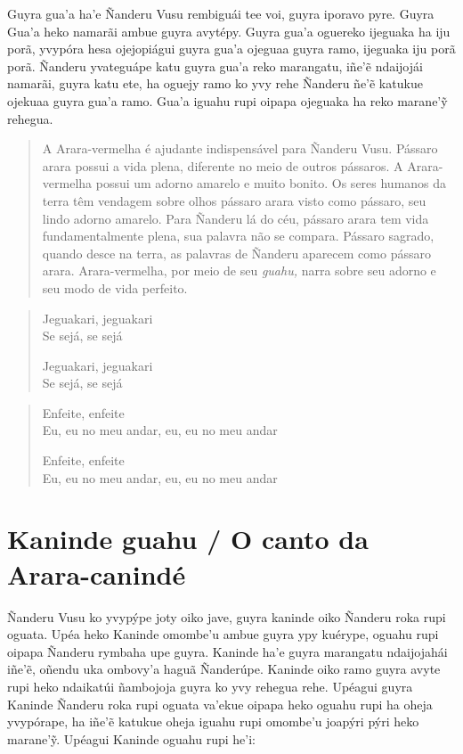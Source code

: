 Guyra gua'a ha'e Ñanderu Vusu rembiguái tee voi, guyra iporavo pyre.
Guyra Gua'a heko namarãi ambue guyra avytépy. Guyra gua'a oguereko
ijeguaka ha iju porã, yvypóra hesa ojejopiágui guyra gua'a ojeguaa guyra
ramo, ijeguaka iju porã porã. Ñanderu yvateguápe katu guyra gua'a reko
marangatu, iñe'ẽ ndaijojái namarãi, guyra katu ete, ha oguejy ramo ko
yvy rehe Ñanderu ñe'ẽ katukue ojekuaa guyra gua'a ramo. Gua'a iguahu
rupi oipapa ojeguaka ha reko marane'ỹ rehegua.

\begin{quote}
A Arara-vermelha é ajudante indispensável para Ñanderu Vusu. Pássaro
arara possui a vida plena, diferente no meio de outros pássaros. A
Arara-vermelha possui um adorno amarelo e muito bonito. Os seres humanos
da terra têm vendagem sobre olhos pássaro arara visto como pássaro, seu
lindo adorno amarelo. Para Ñanderu lá do céu, pássaro arara tem vida
fundamentalmente plena, sua palavra não se compara. Pássaro sagrado,
quando desce na terra, as palavras de Ñanderu aparecem como pássaro
arara. Arara-vermelha, por meio de seu \emph{guahu,} narra sobre seu
adorno e seu modo de vida perfeito.
\end{quote}

\begin{verse}
Jeguakari, jeguakari\\
Se sejá, se sejá

Jeguakari, jeguakari\\
Se sejá, se sejá
\end{verse}

\begin{verse}
Enfeite, enfeite\\
Eu, eu no meu andar, eu, eu no meu andar

Enfeite, enfeite\\
Eu, eu no meu andar, eu, eu no meu andar
\end{verse}

\chapter{Kaninde guahu / O canto da Arara-canindé}

Ñanderu Vusu ko yvypýpe joty oiko jave, guyra kaninde oiko Ñanderu roka
rupi oguata. Upéa heko Kaninde omombe'u ambue guyra ypy kuérype, oguahu
rupi oipapa Ñanderu rymbaha upe guyra. Kaninde ha'e guyra marangatu
ndaijojahái iñe'ẽ, oñendu uka ombovy'a haguã Ñanderúpe. Kaninde oiko
ramo guyra avyte rupi heko ndaikatúi ñambojoja guyra ko yvy rehegua
rehe. Upéagui guyra Kaninde Ñanderu roka rupi oguata va'ekue oipapa heko
oguahu rupi ha oheja yvypórape, ha iñe'ẽ katukue oheja iguahu rupi
omombe'u joapýri pýri heko marane'ỹ. Upéagui Kaninde oguahu rupi he'i:

